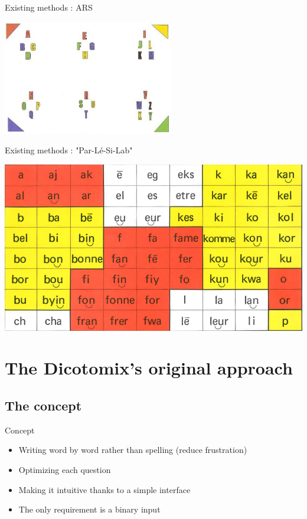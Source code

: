 \documentclass[graphics]{beamer}
\begin{document}
\begin{frame}{Existing methods : ARS}
	\begin{center}
		\includegraphics[scale=0.9]{tableau_lettres_transparent}
	\end{center}
\end{frame}

\begin{frame}{Existing methods : "Par-Lé-Si-Lab"}
	\begin{center}
		\includegraphics[scale=0.3]{parler_syllabes}
	\end{center}
\end{frame}

\section{The Dicotomix's original approach}
\subsection{The concept}

\begin{frame}{Concept}
	\begin{center}
		\begin{itemize}
			\item Writing word by word rather than spelling (reduce frustration)
			\item Optimizing each question
			\item Making it intuitive thanks to a simple interface
			\item The only requirement is a binary input
		\end{itemize}
	\end{center}
\end{frame}
\end{document}
